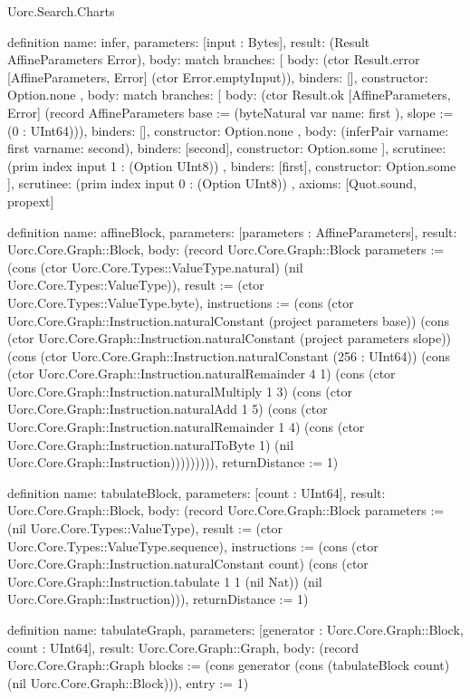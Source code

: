 \begin{lexlean}{Uorc.Search.Charts}
\begin{semanticmodule}
definition{
  name: infer,
  parameters: [input : Bytes],
  result: (Result AffineParameters Error),
  body: match{
    branches: [
      {
        body: (ctor Result.error [AffineParameters, Error] (ctor Error.emptyInput)),
        binders: [],
        constructor: Option.none
      },
      {
        body: match{
          branches: [
            {
              body: (ctor Result.ok [AffineParameters, Error] (record AffineParameters {base := (byteNatural var{
                name: first
              }), slope := (0 : UInt64)})),
              binders: [],
              constructor: Option.none
            },
            {
              body: (inferPair var{name: first} var{name: second}),
              binders: [second],
              constructor: Option.some
            }
          ],
          scrutinee: (prim index input 1 : (Option UInt8))
        },
        binders: [first],
        constructor: Option.some
      }
    ],
    scrutinee: (prim index input 0 : (Option UInt8))
  },
  axioms: [Quot.sound, propext]
}

definition{
  name: affineBlock,
  parameters: [parameters : AffineParameters],
  result: Uorc.Core.Graph::Block,
  body: (record Uorc.Core.Graph::Block {parameters := (cons (ctor Uorc.Core.Types::ValueType.natural) (nil Uorc.Core.Types::ValueType)), result := (ctor Uorc.Core.Types::ValueType.byte), instructions := (cons (ctor Uorc.Core.Graph::Instruction.naturalConstant (project parameters base)) (cons (ctor Uorc.Core.Graph::Instruction.naturalConstant (project parameters slope)) (cons (ctor Uorc.Core.Graph::Instruction.naturalConstant (256 : UInt64)) (cons (ctor Uorc.Core.Graph::Instruction.naturalRemainder 4 1) (cons (ctor Uorc.Core.Graph::Instruction.naturalMultiply 1 3) (cons (ctor Uorc.Core.Graph::Instruction.naturalAdd 1 5) (cons (ctor Uorc.Core.Graph::Instruction.naturalRemainder 1 4) (cons (ctor Uorc.Core.Graph::Instruction.naturalToByte 1) (nil Uorc.Core.Graph::Instruction))))))))), returnDistance := 1})
}

definition{
  name: tabulateBlock,
  parameters: [count : UInt64],
  result: Uorc.Core.Graph::Block,
  body: (record Uorc.Core.Graph::Block {parameters := (nil Uorc.Core.Types::ValueType), result := (ctor Uorc.Core.Types::ValueType.sequence), instructions := (cons (ctor Uorc.Core.Graph::Instruction.naturalConstant count) (cons (ctor Uorc.Core.Graph::Instruction.tabulate 1 1 (nil Nat)) (nil Uorc.Core.Graph::Instruction))), returnDistance := 1})
}

definition{
  name: tabulateGraph,
  parameters: [generator : Uorc.Core.Graph::Block, count : UInt64],
  result: Uorc.Core.Graph::Graph,
  body: (record Uorc.Core.Graph::Graph {blocks := (cons generator (cons (tabulateBlock count) (nil Uorc.Core.Graph::Block))), entry := 1})
}


\end{semanticmodule}
\end{lexlean}
